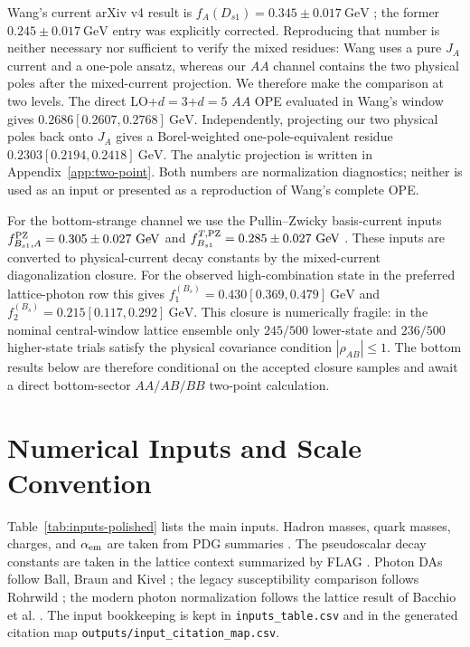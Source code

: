 \documentclass[11pt]{article}
\newcommand{\Bsone}{B_{s1}}
\newcommand{\GeV}{\mathrm{GeV}}
\begin{document}
Wang's current arXiv v4 result is
$f_A(D_{s1})=0.345\pm0.017~\GeV$ \cite{Wang2015}; the former
$0.245\pm0.017~\GeV$ entry was explicitly corrected.  Reproducing that number
is neither necessary nor sufficient to verify the mixed residues: Wang uses a
pure $J_A$ current and a one-pole ansatz, whereas our $AA$ channel contains the
two physical poles after the mixed-current projection.  We therefore make the
comparison at two levels.  The direct LO+$d=3$+$d=5$ $AA$ OPE evaluated in
Wang's window gives $0.2686[0.2607,0.2768]~\GeV$.  Independently, projecting
our two physical poles back onto $J_A$ gives a Borel-weighted one-pole-equivalent
residue $0.2303[0.2194,0.2418]~\GeV$.  The analytic projection is written in
Appendix~\ref{app:two-point}.  Both numbers are normalization diagnostics;
neither is used as an input or presented as a reproduction of Wang's complete
OPE.

For the bottom-strange channel we use the Pullin--Zwicky basis-current inputs
$f_{\Bsone,A}^{\rm PZ}=0.305\pm0.027~\GeV$ and
$f_{\Bsone}^{T,\rm PZ}=0.285\pm0.027~\GeV$ \cite{PullinZwicky2021}.  These
inputs are converted to physical-current decay constants by the mixed-current
diagonalization closure.  For the observed high-combination state in the
preferred lattice-photon row this gives
$f_1^{(B_s)}=0.430[0.369,0.479]~\GeV$ and
$f_2^{(B_s)}=0.215[0.117,0.292]~\GeV$.  This closure is numerically fragile:
in the nominal central-window lattice ensemble only $245/500$ lower-state and
$236/500$ higher-state trials satisfy the physical covariance condition
$|\rho_{AB}|\leq1$.  The bottom results below are therefore conditional on the
accepted closure samples and await a direct bottom-sector $AA/AB/BB$ two-point
calculation.

\section{Numerical Inputs and Scale Convention}

Table~\ref{tab:inputs-polished} lists the main inputs.  Hadron masses, quark
masses, charges, and $\alpha_{\rm em}$ are taken from PDG summaries
\cite{PDG2024}.  The pseudoscalar decay constants are taken in the lattice
context summarized by FLAG \cite{FLAG2024}.  Photon DAs follow Ball, Braun and
Kivel \cite{Ball:2002ps}; the legacy susceptibility comparison follows
Rohrwild \cite{Rohrwild2007}; the modern photon normalization follows the
lattice result of Bacchio et al. \cite{Bacchio2024}.  The input bookkeeping is
kept in \texttt{inputs\_table.csv} and in the generated citation map
\texttt{outputs/input\_citation\_map.csv}.
\end{document}
